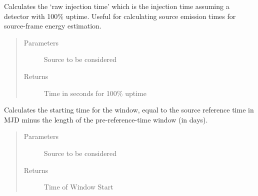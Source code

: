 \documentclass[letterpaper,10pt,english]{sphinxmanual}
\begin{document}
\begin{fulllineitems}
\begin{fulllineitems}
\begin{quote}
\begin{description}
\end{description}\end{quote}

\end{fulllineitems}


\begin{fulllineitems}
\label{\detokenize{index:flarestack.core.time_pdf.Steady.raw_injection_time}}
Calculates the ‘raw injection time’ which is the injection time
assuming a detector with 100\% uptime. Useful for calculating source
emission times for source-frame energy estimation.
\begin{quote}\begin{description}
\item[{Parameters}] \leavevmode
{} \textendash{} Source to be considered

\item[{Returns}] \leavevmode
Time in seconds for 100\% uptime

\end{description}\end{quote}

\end{fulllineitems}


\begin{fulllineitems}
\label{\detokenize{index:flarestack.core.time_pdf.Steady.sig_t0}}
Calculates the starting time for the window, equal to the
source reference time in MJD minus the length of the pre-reference-time
window (in days).
\begin{quote}\begin{description}
\item[{Parameters}] \leavevmode
{} \textendash{} Source to be considered

\item[{Returns}] \leavevmode
Time of Window Start

\end{description}\end{quote}


\end{fulllineitems}
\end{fulllineitems}
\end{document}
